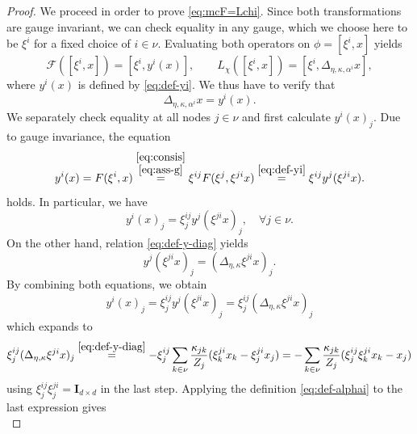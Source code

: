 \documentclass[10pt,reqno]{amsart}
\numberwithin{equation}{section}
\theoremstyle{bfnote}
\theoremstyle{bfdef}
\newcommand{\mc}[1]{\mathcal{#1}}
\newcommand{\II}{\mathbf{I}_{d \times d}}
\begin{document}
\begin{proof}
		We proceed in order to prove \eqref{eq:mcF=Lchi}.
		Since both transformations are gauge invariant, we can check equality in any gauge, which we choose here to be $\xi^{i}$ for a fixed choice of $i \in \nu$. Evaluating both operators on $\phi = [\xi^{i},x]$ yields
		\begin{equation}
			\mc{F}([\xi^{i},x]) = [\xi^{i},y^{i}(x)], \qquad
			L_{\chi}([\xi^{i},x]) = [\xi^{i},\Delta_{\eta,\kappa,\alpha^{i}}x],
		\end{equation}
	 	where $y^{i}(x)$ is defined by \eqref{eq:def-yi}.
		We thus have to verify that
		\begin{equation}\label{eq:proof-show-Delta-y-i}\Delta_{\eta,\kappa,\alpha^{i}}x = y^{i}(x).
		\end{equation}
		We separately check equality at all nodes $j \in \nu$ and first calculate $y^{i}(x)_j$. Due to gauge invariance, the equation
		\begin{equation}
			y^{i}(x) = F(\xi^{i},x)
			\overset{
				\substack{
					\eqref{eq:consis} \\ \eqref{eq:ass-g}
				}
			}{=}
			\xi^{ij} F(\xi^{j},\xi^{ji}x)
			\overset{
				\eqref{eq:def-yi}
			}{=}
			\xi^{ij} y^{j}(\xi^{ji}x).
		\end{equation}
		holds. In particular, we have
		\begin{equation}
			y^{i}(x)_{j} = \xi^{ij}_{j} y^{j}(\xi^{ji}x)_{j}, \quad \forall j \in \nu.
		\end{equation}
		On the other hand, relation \eqref{eq:def-y-diag} yields
		\begin{equation}
			y^{j}(\xi^{ji} x)_{j} = (\Delta_{\eta,\kappa} \xi^{ji}x)_{j}.
		\end{equation}
		By combining both equations, we obtain
		\begin{equation}\label{eq:proof-F-L-aux-1}
			y^{i}(x)_{j}
			= \xi^{ij}_{j}y^{j}(\xi^{ji}x)_j
			= \xi^{ij}_{j}(\Delta_{\eta,\kappa} \xi^{ji}x )_{j}
		\end{equation}
		which expands to
		\begin{equation}
			\xi^{ij}_{j}(\Delta_{\eta,\kappa} \xi^{ji}x )_{j}
			\overset{\eqref{eq:def-y-diag}}{=}
			- \xi^{ij}_{j} \sum_{k\in \nu} \frac{\kappa_{jk}}{Z_{j}}(\xi^{ji}_{k} x_{k} - \xi^{ji}_{j} x_{j})
			=
			- \sum_{k \in \nu} \frac{\kappa_{jk}}{Z_{j}}(\xi^{ij}_{j}\xi^{ji}_{k}x_{k} - x_{j})
		\end{equation}
		using $\xi^{ij}_{j}\xi^{ji}_{j} = \II$ in the last step. Applying the definition \eqref{eq:def-alphai} to the last expression gives
		\begin{equation}\label{eq:proof-F-L-aux-2}

\end{equation}
\end{proof}
\end{document}
